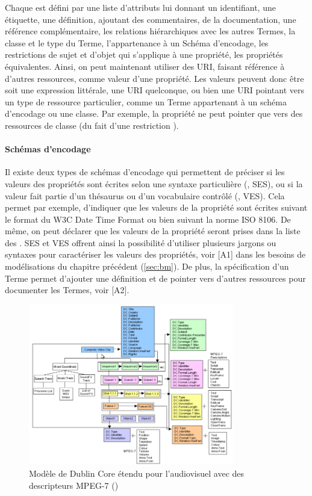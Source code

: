 Chaque  est défini par une liste d'attributs lui donnant un identifiant, une étiquette, une définition, ajoutant des commentaires, de la documentation, une référence complémentaire, les relations hiérarchiques avec les autres Termes, la classe et le type du Terme, l'appartenance à un Schéma d'encodage, les restrictions de sujet et d'objet qui s'applique à une propriété, les propriétés équivalentes.
Ainsi, on peut maintenant utiliser des URI, faisant référence à d'autres ressources, comme valeur d'une propriété.
Les valeurs peuvent donc être soit une expression littérale, une URI quelconque, ou bien une URI pointant vers un type de ressource particulier, comme un Terme appartenant à un schéma d'encodage ou une classe.
Par exemple, la propriété  ne peut pointer que vers des ressources de classe  (du fait d'une restriction ). 


\paragraph{Schémas d'encodage}
Il existe deux types de schémas d'encodage qui permettent de préciser si les valeurs des propriétés sont écrites selon une syntaxe particulière (, SES), ou si la valeur fait partie d'un thésaurus ou d'un vocabulaire contrôlé (, VES).
Cela permet par exemple, d'indiquer que les valeurs de la propriété  sont écrites suivant le format du W3C Date Time Format ou bien suivant la norme ISO 8106. 
De même, on peut déclarer que les valeurs de la propriété  seront prises dans la liste des . 
SES et VES offrent ainsi la possibilité d'utiliser plusieurs jargons ou syntaxes pour caractériser les valeurs des propriétés, voir [A1] dans les besoins de modélisations du chapitre précédent (\ref{sec:bm}).
De plus, la spécification d'un Terme permet d'ajouter une définition et de pointer vers d'autres ressources pour documenter les Termes, voir [A2].

\begin{figure}[ht!]
\centering
\includegraphics[width=0.8\textwidth]{images/HunterDCMI-MPEG7.png}
\caption{Modèle de Dublin Core étendu pour l'audiovisuel avec des descripteurs MPEG-7 (\cite{Hunter1999})}
\label{img:dcmi-mpeg7}
\end{figure}



